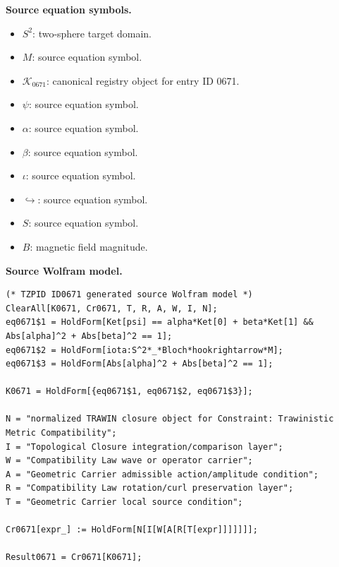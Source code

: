 \begin{minipage}[t]{0.49\linewidth}
\begingroup
\small
\raggedright
\textbf{Source equation symbols.}\par
\begin{itemize}[leftmargin=1.35em,itemsep=1pt,topsep=1pt,parsep=0pt]
    \item $S^2$: two-sphere target domain.
    \item $M$: source equation symbol.
    \item $\mathcal{K}_{0671}$: canonical registry object for entry ID 0671.
    \item $\psi$: source equation symbol.
    \item $\alpha$: source equation symbol.
    \item $\beta$: source equation symbol.
    \item $\iota$: source equation symbol.
    \item $\hookrightarrow$: source equation symbol.
    \item $S$: source equation symbol.
    \item $B$: magnetic field magnitude.
\end{itemize}
\endgroup
\end{minipage}\hfill
\begin{minipage}[t]{0.47\linewidth}
\begingroup
\scriptsize
\raggedright
\textbf{Source Wolfram model.}\par
\begin{Verbatim}[fontsize=\tiny,breaklines=true,breakanywhere=true]
(* TZPID ID0671 generated source Wolfram model *)
ClearAll[K0671, Cr0671, T, R, A, W, I, N];
eq0671$1 = HoldForm[Ket[psi] == alpha*Ket[0] + beta*Ket[1] && Abs[alpha]^2 + Abs[beta]^2 == 1];
eq0671$2 = HoldForm[iota:S^2*_*Bloch*hookrightarrow*M];
eq0671$3 = HoldForm[Abs[alpha]^2 + Abs[beta]^2 == 1];

K0671 = HoldForm[{eq0671$1, eq0671$2, eq0671$3}];

N = "normalized TRAWIN closure object for Constraint: Trawinistic Metric Compatibility";
I = "Topological Closure integration/comparison layer";
W = "Compatibility Law wave or operator carrier";
A = "Geometric Carrier admissible action/amplitude condition";
R = "Compatibility Law rotation/curl preservation layer";
T = "Geometric Carrier local source condition";

Cr0671[expr_] := HoldForm[N[I[W[A[R[T[expr]]]]]]];

Result0671 = Cr0671[K0671];
\end{Verbatim}
\endgroup
\end{minipage}

